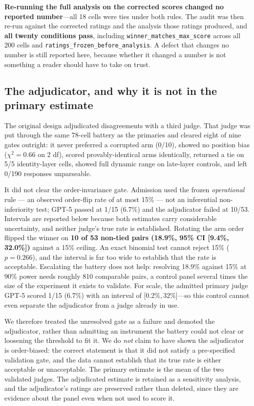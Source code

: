 \documentclass[11pt]{article}
\newcommand{\ci}[2]{[#1,\,#2]}
\newcommand{\flag}[1]{\textcolor{flagged}{#1}}
\begin{document}
\textbf{Re-running the full analysis on the corrected scores changed no reported
number}---all 18 cells were ties under both rules. The audit was then re-run
against the corrected ratings and the analysis those ratings produced, and
\textbf{all twenty conditions pass}, including
\texttt{winner\_matches\_max\_score} across all 200 cells and
\texttt{ratings\_frozen\_before\_analysis}. A defect that changes no number is
still reported here, because whether it changed a number is not something a
reader should have to take on trust.

\subsection{The adjudicator, and why it is not in the primary estimate}
\label{sec:adjudicator}

The original design adjudicated disagreements with a third judge. That judge was
put through the same 78-cell battery as the primaries and cleared eight of nine
gates outright: it never preferred a corrupted arm (0/10), showed no position
bias ($\chi^2 = 0.66$ on 2 df), scored provably-identical arms identically,
returned a tie on 5/5 identity-layer cells, showed full dynamic range on
late-layer controls, and left 0/190 responses unparseable.

It did not clear the order-invariance gate. Admission used the frozen
\emph{operational} rule --- an observed order-flip rate of at most 15\% --- not
an inferential non-inferiority test; GPT-5 passed at 1/15 (6.7\%) and the
adjudicator failed at 10/53. Intervals are reported below because both estimates
carry considerable uncertainty, and neither judge's true rate is established. Rotating the arm order flipped the winner on \textbf{10 of 53
non-tied pairs (18.9\%, 95\% CI \ci{9.4\%}{32.0\%})} against a 15\% ceiling.
An exact binomial test cannot reject 15\% ($p = 0.266$), and the interval is far
too wide to establish that the rate is acceptable. Escalating the battery does
not help: resolving 18.9\% against 15\% at 90\% power needs roughly 810
comparable pairs, a control panel several times the size of the experiment it
exists to validate. For scale, the admitted primary judge GPT-5 scored 1/15
(6.7\%) with an interval of \ci{0.2\%}{32\%}---so this control cannot even
separate the adjudicator from a judge already in use.

\flag{We therefore treated the unresolved gate as a failure and demoted the
adjudicator}, rather than admitting an instrument the battery could not clear or
loosening the threshold to fit it. We do \emph{not} claim to have shown the
adjudicator is order-biased: the correct statement is that it did not satisfy a
pre-specified validation gate, and the data cannot establish that its true rate
is either acceptable or unacceptable. The primary estimate is the mean of the
two validated judges. The adjudicated estimate is retained as a sensitivity
analysis, and the adjudicator's ratings are preserved rather than deleted, since
they are evidence about the panel even when not used to score it.
\end{document}
